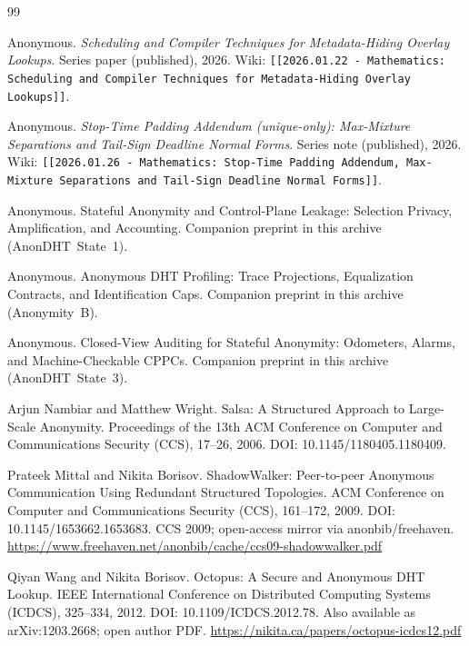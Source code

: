 \documentclass[11pt]{article}
\begin{document}
\begin{thebibliography}{99}\small

Anonymous.
\newblock \emph{Scheduling and Compiler Techniques for Metadata-Hiding Overlay Lookups}.
\newblock Series paper (published), 2026.
\newblock Wiki: \texttt{[[2026.01.22 - Mathematics: Scheduling and Compiler Techniques for Metadata-Hiding Overlay Lookups]]}.

Anonymous.
\newblock \emph{Stop-Time Padding Addendum (unique-only): Max-Mixture Separations and Tail-Sign Deadline Normal Forms}.
\newblock Series note (published), 2026.
\newblock Wiki: \texttt{[[2026.01.26 - Mathematics: Stop-Time Padding Addendum, Max-Mixture Separations and Tail-Sign Deadline Normal Forms]]}.

Anonymous.
\newblock Stateful Anonymity and Control-Plane Leakage: Selection Privacy, Amplification, and Accounting.
\newblock Companion preprint in this archive (AnonDHT~State~1).

Anonymous.
\newblock Anonymous DHT Profiling: Trace Projections, Equalization Contracts, and Identification Caps.
\newblock Companion preprint in this archive (Anonymity~B).

Anonymous.
\newblock Closed-View Auditing for Stateful Anonymity: Odometers, Alarms, and Machine-Checkable CPPCs.
\newblock Companion preprint in this archive (AnonDHT~State~3).

Arjun Nambiar and Matthew Wright.
\newblock Salsa: A Structured Approach to Large-Scale Anonymity.
\newblock Proceedings of the 13th ACM Conference on Computer and Communications Security (CCS), 17--26, 2006.
\newblock DOI: 10.1145/1180405.1180409.

Prateek Mittal and Nikita Borisov.
\newblock ShadowWalker: Peer-to-peer Anonymous Communication Using Redundant Structured Topologies.
\newblock ACM Conference on Computer and Communications Security (CCS), 161--172, 2009.
\newblock DOI: 10.1145/1653662.1653683.
\newblock CCS 2009; open-access mirror via anonbib/freehaven.
\newblock \url{https://www.freehaven.net/anonbib/cache/ccs09-shadowwalker.pdf}

Qiyan Wang and Nikita Borisov.
\newblock Octopus: A Secure and Anonymous {DHT} Lookup.
\newblock IEEE International Conference on Distributed Computing Systems (ICDCS), 325--334, 2012.
\newblock DOI: 10.1109/ICDCS.2012.78.
\newblock Also available as arXiv:1203.2668; open author PDF.
\newblock \url{https://nikita.ca/papers/octopus-icdcs12.pdf}


\end{thebibliography}
\end{document}
